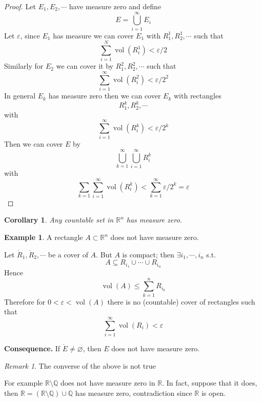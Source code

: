 \documentclass[11pt,openany]{book}
\theoremstyle{plain}
\newtheorem{corollary}{Corollary}[chapter]
\theoremstyle{definition}
\newtheorem{example}{Example}[chapter]
\theoremstyle{remark}
\newtheorem{remark}{Remark}[chapter]
\newcommand{\R}{\mathbb{R}}
\newcommand{\Q}{\mathbb{Q}}
\newcommand{\vol}{\operatorname{vol}}
\begin{document}
\begin{proof}
    Let $E_1, E_2, \cdots$ have measure zero and define 
    $$ E= \bigcup_{i=1}^\infty E_i$$
    Let $\varepsilon$, since $E_1$ has measure we can cover $E_1$ with 
    $R_1^1, R_2^1, \cdots$ such that
    $$\sum_{i=1}^N \vol (R_i^1) < \varepsilon/2$$
    Similarly for $E_2$ we can cover it by $R_1^2, R_2^2, \cdots$ such that 
    $$\sum_{i=1}^\infty \vol (R_i^2) < \varepsilon/2^2$$
    In general $E_k$ has measure zero then we can cover $E_k$ with rectangles 
    $$R_1^k, R_2^k, \cdots$$
    with 
    $$\sum_{i=1}^\infty \vol (R_i^k) < \varepsilon/2^k$$
    Then we can cover $E$ by 
    $$\bigcup_{k=1}^\infty \bigcup_{i=1}^\infty R_i^k$$
    with 
    $$\sum_{k=1} \sum_{i=1}^\infty \vol (R_i^k) < \sum_{k=1}^\infty \varepsilon/2^k = \varepsilon$$
\end{proof}

\begin{corollary}
    Any countable set in $\R^n$ has measure zero. 
\end{corollary}

\begin{example}
    A rectangle $A \subset \R^n$ does not have measure zero. 

    Let $\mathring{R}_1, \mathring{R}_2, \cdots$ be a cover of $A$. But $A$ is compact; 
    then $\exists i_1, \cdots, i_n$ s.t. 
    $$A \subseteq R_{i_1} \cup \cdots \cup R_{i_n} $$
    Hence 
    $$\vol (A) \le \sum_{k=1}^n R_{i_k}$$
    Therefore for $0 < \varepsilon < \vol (A)$ there is no (countable) cover of rectangles 
    such that
    $$\sum_{i=1}^\infty \vol (R_i) < \varepsilon$$

    \textbf{Consequence.} If $\mathring{E} \ne \varnothing$, then $E$ does not have measure zero.  
\end{example}

\begin{remark}
    The converse of the above is not true

    For example $\R \setminus \Q$ does not have measure zero in $\R$. In fact, suppose that it does, then 
    $\R = (\R \setminus \Q) \cup \Q$ has measure zero, contradiction since $\R$ is open.  
\end{remark}
\end{document}
